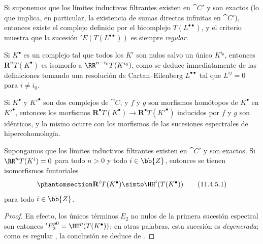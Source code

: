 \documentclass[oneside]{amsart}
\let\EGAOriginalLabel\label
\renewcommand{\label}[1]{\phantomsection\EGAOriginalLabel{#1}}
\begin{document}
\begin{env}[11.4.3]
Si suponemos que los límites inductivos filtrantes existen en $\cat{C}'$ y son exactos (lo que implica, en particular, la existencia de sumas directas infinitas en $\cat{C}'$), entonces existe el complejo definido por el bicomplejo $T(L^{\bullet\bullet})$, y el criterio  muestra que la sucesión $'E(T(L^{\bullet\bullet}))$ es siempre \emph{regular}.

Si $K^\bullet$ es un complejo tal que todos los $K^i$ son nulos salvo un único $K^{i_0}$, entonces
$\mathbf{R}^n T(K^\bullet)$ es isomorfo a $\RR^{n-i_0} T(K^{i_0})$, como se deduce inmediatamente de las definiciones tomando una resolución de Cartan--Eilenberg $L^{\bullet\bullet}$ tal que $L^{ij}=0$ para $i\neq i_0$.

Si $K^\bullet$ y $K'^\bullet$ son dos complejos de $\cat{C}$, y $f$ y $g$ son morfismos homótopos de $K^\bullet$ en $K'^\bullet$, entonces los morfismos $\mathbf{R}^\bullet T(K^\bullet) \rightarrow \mathbf{R}^\bullet T(K'^\bullet)$ inducidos por $f$ y $g$ son idénticos, y lo mismo ocurre con los morfismos de las sucesiones espectrales de hipercohomología.
\end{env}

\begin{proposition}[11.4.5]
\label{0.11.4.5}
Supongamos que los límites inductivos filtrantes existen en $\cat{C}'$ y son exactos.
Si $\RR^n T(K^i) = 0$ para todo $n>0$ y todo $i\in\bb{Z}$, entonces se tienen isomorfismos funtoriales
\[
\label{0.11.4.5.1}
  \mathbf{R}^i T(K^\bullet) \simto \HH^i(T(K^\bullet))
\tag{11.4.5.1}
\]
para todo $i\in\bb{Z}$.
\end{proposition}

\begin{proof}
En efecto, los únicos términos $E_2$ no nulos de la primera sucesión espectral  son entonces $'E_2^{p0} = \HH^p(T(K^\bullet))$;
en otras palabras, esta sucesión es \emph{degenerada};
como es regular , la conclusión se deduce de .
\end{proof}
\end{document}
